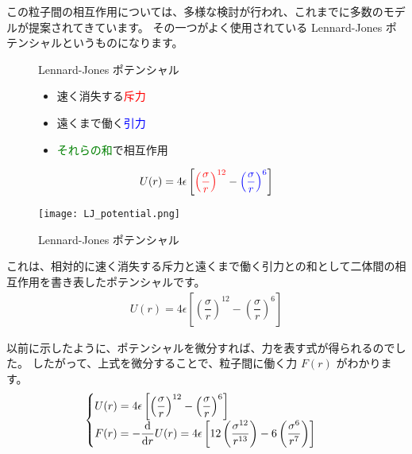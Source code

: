 \documentclass[uplatex,dvipdfmx,a4paper,11pt]{jsarticle}
\begin{document}
この粒子間の相互作用については、多様な検討が行われ、これまでに多数のモデルが提案されてきています。
その一つがよく使用されている Lennard-Jones ポテンシャルというものになります。
\begin{figure}[htb]
	\begin{center}
		\begin{minipage}{0.4\textwidth}
			\large
			\begin{itembox}[l]{Lennard-Jones ポテンシャル}
				\begin{itemize}
					\item 速く消失する\textcolor{red}{斥力}
					\item 遠くまで働く\textcolor{blue}{引力}
					\item \textcolor{green}{それらの和}で相互作用
				\end{itemize}
				\begin{align*}
					U(r) = 4 \epsilon \left[ \textcolor{red}{\left(\dfrac{\sigma}{r} \right)^{12}} - \textcolor{blue}{\left(\dfrac{\sigma}{r} \right)^{6}} \right]
				\end{align*}
			\end{itembox}
		\end{minipage}
		\begin{minipage}{0.5\textwidth}
			\begin{center}
			\texttt{[image: LJ\_potential.png]}
			\end{center}
		\end{minipage}
		\caption{Lennard-Jones ポテンシャル}
		\label{fig:Lennard-Jones}
	\end{center}
\end{figure}

これは、相対的に速く消失する斥力と遠くまで働く引力との和として二体間の相互作用を書き表したポテンシャルです。
\begin{align*}
	U(r) = 4 \epsilon \left[ \left(\dfrac{\sigma}{r} \right)^{12} - \left(\dfrac{\sigma}{r} \right)^{6} \right]
\end{align*}

以前に示したように、ポテンシャルを微分すれば、力を表す式が得られるのでした。
したがって、上式を微分することで、粒子間に働く力 $F(r)$ がわかります。
\begin{align*}
	\begin{cases}
		U(r) = 4 \epsilon \left[ \left(\dfrac{\sigma}{r} \right)^{12} - \left(\dfrac{\sigma}{r} \right)^{6} \right] \\
		F(r) = -\dfrac{\mathrm{d}}{\mathrm{d} r}U(r) = 4 \epsilon \left[ 12 \left(\dfrac{\sigma^{12}}{r^{13}} \right) - 6 \left(\dfrac{\sigma^6}{r^7} \right) \right]
	\end{cases}
\end{align*}
\end{document}
